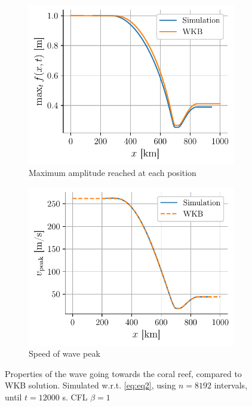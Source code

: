 \begin{figure}[h]
    \centering
    \begin{subfigure}{0.48\linewidth}
        \centering
        \includegraphics[width=\linewidth]{figures/corail_eq2_amplitude_wkb.pdf}
        \caption{Maximum amplitude reached at each position}
        \label{fig:corail_eq2_amplitude}
    \end{subfigure}
    \begin{subfigure}{0.48\linewidth}
        \centering
        \includegraphics[width=\linewidth]{figures/corail_eq2_vitesse_wkb.pdf}
        \caption{Speed of wave peak}
        \label{fig:corail_eq2_vitesse}
    \end{subfigure}
    \caption{Properties of the wave going towards the coral reef, compared to WKB solution. Simulated w.r.t. \autoref{eq:eq2}, using \(n=8192\) intervals, until \(t=12000\) \si{\second}. CFL \(\beta=1\)}
    \label{fig:corail_eq2_properties}
\end{figure}
